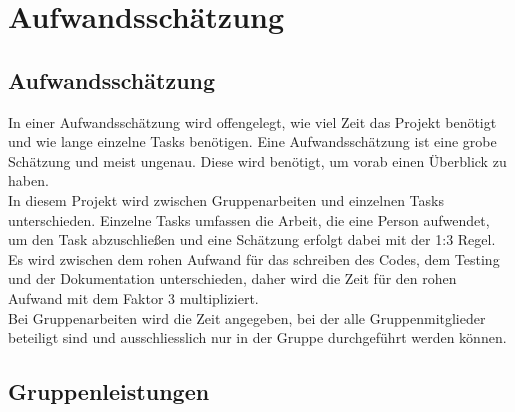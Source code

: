\chapter{Aufwandsschätzung}\label{ch:aufwandsschatzung}
\newcommand{\trschaetzung}[3]{\rowcolor{lightgray}\multicolumn{1}{|l|}{\textbf{#1}} & \textbf{#2} \\* \multicolumn{2}{|l|}{\begin{tabular}[c]{@{}l@{}}#3\end{tabular}} \\ \hline}

\section{Aufwandsschätzung}\label{sec:aufwandsschatzung}

In einer Aufwandsschätzung wird offengelegt, wie viel Zeit das Projekt benötigt und wie lange einzelne Tasks benötigen.
Eine Aufwandsschätzung ist eine grobe Schätzung und meist ungenau. Diese wird benötigt, um vorab einen Überblick zu haben.\\
In diesem Projekt wird zwischen Gruppenarbeiten und einzelnen Tasks unterschieden. Einzelne Tasks umfassen die Arbeit, die eine Person aufwendet, um den Task abzuschließen und eine Schätzung erfolgt dabei mit der 1:3 Regel. Es wird zwischen dem rohen Aufwand für das schreiben des Codes, dem Testing und der Dokumentation unterschieden, daher wird die Zeit für den rohen Aufwand mit dem Faktor 3 multipliziert.\\
Bei Gruppenarbeiten wird die Zeit angegeben, bei der alle Gruppenmitglieder beteiligt sind und ausschliesslich nur in der Gruppe durchgeführt werden können. 

\section{Gruppenleistungen}\label{sec:gruppenleistungen}


